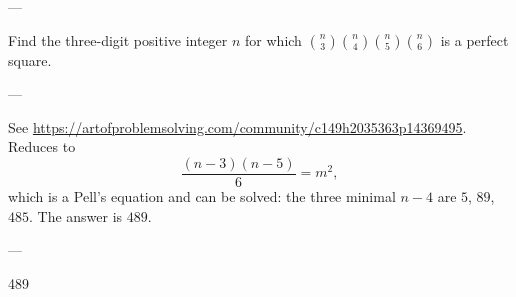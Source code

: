 
---

Find the three-digit positive integer $n$ for which $\binom n3\binom n4\binom n5\binom n6$ is a perfect square.

---

See \url{https://artofproblemsolving.com/community/c149h2035363p14369495}.
Reduces to \[\frac{(n-3)(n-5)}6=m^2,\]
which is a Pell's equation and can be solved: the three minimal $n-4$ are $5$, $89$, $485$. The answer is $489$.

---

489
